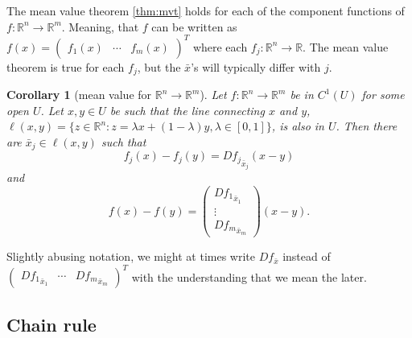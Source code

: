 \documentclass[12pt,reqno]{amsart}
\newtheorem{corollary}{Corollary}[section]
\theoremstyle{definition}
\def\R{\mathbb{R}}
\renewcommand{\to}{{\rightarrow}}
\begin{document}
The mean value theorem \ref{thm:mvt} holds for each of the component
functions of $f:\R^n \to \R^m$. Meaning, that $f$ can be written as
$f(x) = \begin{pmatrix} f_1(x) & \cdots & f_m(x) \end{pmatrix}^T$
where each $f_j:\R^n \to \R$. The mean value theorem is true for each
$f_j$, but the $\bar{x}$'s will typically differ with $j$.
\begin{corollary}[mean value for $\R^n \to \R^m$]\label{thm:mvtm}
  Let $f:\R^n \to \R^m$ be in $C^1(U)$ for some open $U$. Let
  $x, y
  \in U$ be such that the line connecting $x$ and
  $y$, $\ell(x,y) =
  \{z\in \R^n: z = \lambda x + (1-\lambda) y, \lambda \in [0,1]\}$, is
  also in $U$. Then there are $\bar{x}_j \in \ell(x,y)$ such that
  \[ f_j(x) - f_j(y) = D{f_j}_{\bar{x}_j} (x-y) \]
  and
  \[ f(x) - f(y) = \begin{pmatrix} D{f_1}_{\bar{x}_1} \\
    \vdots \\
    D{f_m}_{\bar{x}_m} \end{pmatrix} (x-y). 
  \]  
\end{corollary}
Slightly abusing notation, we might at times write $Df_{\bar{x}}$
instead of $\begin{pmatrix} D{f_1}_{\bar{x}_1} & \cdots &
  D{f_m}_{\bar{x}_m} \end{pmatrix}^T$ with the understanding that we
mean the later.  

\subsection{Chain rule}
\end{document}
